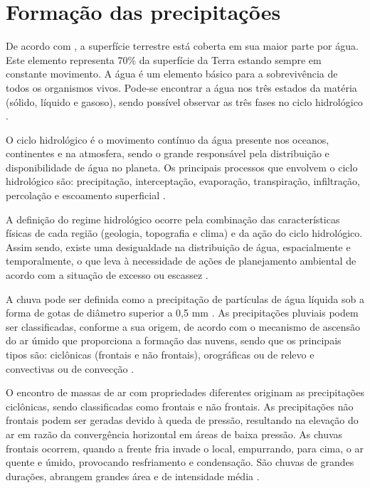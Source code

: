 \section{Formação das precipitações}

De acordo com , a superfície terrestre está coberta em sua maior parte por água. Este elemento representa 70\% da superfície da Terra estando sempre em constante movimento. A água é um elemento básico para a sobrevivência de todos os organismos vivos. Pode-se encontrar a água nos três estados da matéria (sólido, líquido e gasoso), sendo possível observar as três fases no ciclo hidrológico \cite{artigo-ciclo}.

O ciclo hidrológico é o movimento contínuo da água presente nos oceanos, continentes e na atmosfera, sendo o grande responsável pela distribuição e disponibilidade de água no planeta. Os principais processos que envolvem o ciclo hidrológico são: precipitação, interceptação, evaporação, transpiração, infiltração, percolação e escoamento superficial \cite{artigo-ciclo}.

A definição do regime hidrológico ocorre pela combinação das características físicas de cada região (geologia, topografia e clima) e da ação do ciclo hidrológico. Assim sendo, existe uma desigualdade na distribuição de água, espacialmente e temporalmente, o que leva à necessidade de ações de planejamento ambiental de acordo com a situação de excesso ou escassez \cite{artigo-ciclo}.

A chuva pode ser definida como a precipitação de partículas de água líquida sob a forma de gotas de diâmetro superior a 0,5 mm \cite{hidrogeografia}. As precipitações pluviais podem ser classificadas, conforme a sua origem, de acordo com o mecanismo de ascensão do ar úmido que proporciona a formação das nuvens, sendo que os principais tipos são: ciclônicas (frontais e não frontais), orográficas ou de relevo e convectivas ou de convecção \cite{ciclo-hidrologico}.

O encontro de massas de ar com propriedades diferentes originam as precipitações ciclônicas, sendo classificadas como frontais e não frontais. As precipitações não frontais podem ser geradas devido à queda de pressão, resultando na elevação do ar em razão da convergência horizontal em áreas de baixa pressão. As chuvas frontais ocorrem, quando a frente fria invade o local, empurrando, para cima, o ar quente e úmido, provocando resfriamento e condensação. São chuvas de grandes durações, abrangem grandes área e de intensidade média \cite{tucci1993}.

